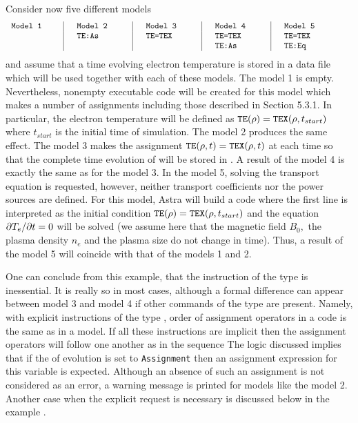 Consider now five different models
\begin{equation}\label{5models}
\begin{tabular}{p{2cm}|p{25mm}|p{25mm}|p{25mm}|p{3cm}}
\tt Model 1&\quad\tt Model 2 &\quad\tt Model 3 &\quad\tt Model 4 
						      &\quad\tt Model 5\\
\tt &\quad\tt TE:As &\quad\tt TE=TEX &\quad\tt TE=TEX &\quad\tt TE=TEX\\
\tt &\quad\tt	    &\quad\tt	     &\quad\tt TE:As  &\quad\tt TE:Eq \\
\end{tabular}
\end{equation}
and assume that a time evolving electron temperature  is
stored in a data file which will be used together with each of these
models. 
The model 1 is empty.
Nevertheless, nonempty executable code will be created for this model
which makes a number of assignments including those described in
Section 5.3.1.
In particular, the electron temperature will be defined as 
${\tt TE}(\rho)={\tt TEX}(\rho,t_{start})$ where $t_{start}$ is the
initial time of simulation.
The model 2 produces the same effect.
The model 3 makes the assignment ${\tt TE}(\rho,t)={\tt TEX}(\rho,t)$ at
each time so that the complete time evolution of  will be stored
in . 
A result of the model 4 is exactly the same as for the model 3.
In the model 5, solving the transport equation is requested,
however, neither transport coefficients nor the power sources are
defined.
For this model, Astra will build a code where the first line 
is interpreted as the initial condition ${\tt TE}(\rho)={\tt
TEX}(\rho,t_{start})$ and the equation $\partial T_e/\partial t=0$ will be
solved (we assume here that the magnetic field $B_0,$ the plasma density
$n_e$ and the plasma size do not change in time).
Thus, a result of the model 5 will coincide with that of the models 1
and 2. 

One can conclude from this example, that the instruction of the type
 is inessential. 
It is really so in most cases, although a formal difference can appear
between model 3 and model 4 if other commands of the type 
are present. 
Namely, with explicit instructions of the type , order of
assignment operators in a code is the same as in a model.
If all these instructions are implicit then the assignment operators
will follow one another as in the sequence 
The logic discussed implies that if the  of evolution is set to
{\tt Assignment} then an assignment expression for this variable is 
expected. 
Although an absence of such an assignment is not considered as an error, 
a warning message is printed for models like the model 2.
Another case when the explicit request  is necessary is
discussed below in the example .

